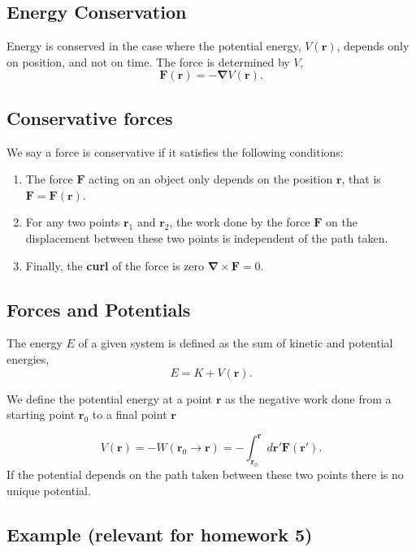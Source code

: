 \documentclass[%
oneside,                 %
final,                   %
10pt]{article}
\begin{document}
\subsection*{Energy Conservation}
Energy is conserved in the case where the potential energy, $V(\bm{r})$, depends only on position, and not on time. The force is determined by $V$,
\begin{equation}
\bm{F}(\bm{r})=-\bm{\nabla} V(\bm{r}).
\end{equation}

\subsection*{Conservative forces}

We say a force is conservative if it satisfies the following conditions:
\begin{enumerate}
\item The force $\bm{F}$ acting on an object only depends on the position $\bm{r}$, that is $\bm{F}=\bm{F}(\bm{r})$.

\item For any two points $\bm{r}_1$ and $\bm{r}_2$, the work done by the force $\bm{F}$ on the displacement between these two points is independent of the path taken.

\item Finally, the \textbf{curl} of the force is zero $\bm{\nabla}\times\bm{F}=0$.
\end{enumerate}

\noindent
\subsection*{Forces and Potentials}

The energy $E$ of a given system is defined as the sum of kinetic and potential energies,
\[
E=K+V(\bm{r}).
\]

We define the potential energy at a point $\bm{r}$ as the negative work done from a starting point $\bm{r}_0$ to a final point $\bm{r}$ 

\[
V(\bm{r})=-W(\bm{r}_0\rightarrow\bm{r})= -\int_{\bm{r}_0}^{\bm{r}}d\bm{r}'\bm{F}(\bm{r}').
\]
If the potential depends on the path taken between these two points there is no unique potential.

\subsection*{Example (relevant for homework 5)}
\end{document}
